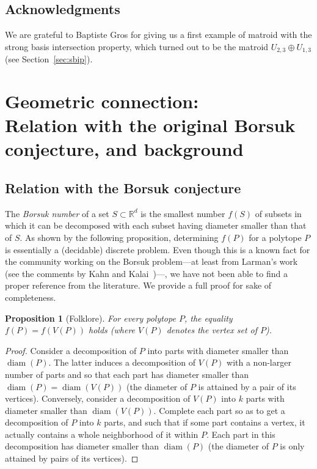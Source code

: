 \documentclass[12pt]{amsart}
\theoremstyle{plain}
\newtheorem{proposition}[theorem]{Proposition}
\theoremstyle{definition}
\theoremstyle{remark}
\newcommand{\R}{\mathbb{R}}
\newcommand{\diame}{\mathsf{diam}}
\def \diame {\operatorname{diam}}
\begin{document}
\subsection*{Acknowledgments} We are grateful to Baptiste Gros for giving us a first example of matroid with the strong basis intersection property, which turned out to be the matroid $U_{2,3}\oplus U_{1,3}$ (see Section~\ref{sec:sbip}).

\section{Geometric connection:\\ Relation with the original Borsuk conjecture, and background}\label{sec:comb-geo}

\subsection{Relation with the Borsuk conjecture} The {\em Borsuk number} of a set $S\subset \R^d$ is the smallest number $f(S)$ of subsets in which it can be decomposed with each subset having diameter smaller than that of $S$. As shown by the following proposition, determining $f(P)$ for a polytope $P$ is essentially a (decidable) discrete problem. Even though this is a known fact for the community working on the Borsuk problem---at least from Larman's work (see the comments by Kahn and Kalai~\cite{kahn1993counterexample})---, we have not been able to find a proper reference from the literature. We provide a full proof for sake of completeness.

\begin{proposition}[Folklore]\label{prop:pol-vert}
For every polytope $P$, the equality $f(P) = f(V(P))$ holds (where $V(P)$ denotes the vertex set of $P$).
\end{proposition}

\begin{proof}
Consider a decomposition of $P$ into parts with diameter smaller than $\diame(P)$. The latter induces a decomposition of $V(P)$ with a non-larger number of parts and so that each part has diameter smaller than $\diame(P) = \diame(V(P))$ (the diameter of $P$ is attained by a pair of its vertices). Conversely, consider a decomposition of $V(P)$ into $k$ parts with diameter smaller than $\diame(V(P))$. Complete each part so as to get a decomposition of $P$ into $k$ parts, and such that if some part contains a vertex, it actually contains a whole neighborhood of it within $P$. Each part in this decomposition has diameter smaller than $\diame(P)$ (the diameter of $P$ is only attained by pairs of its vertices).
\end{proof}
\end{document}
